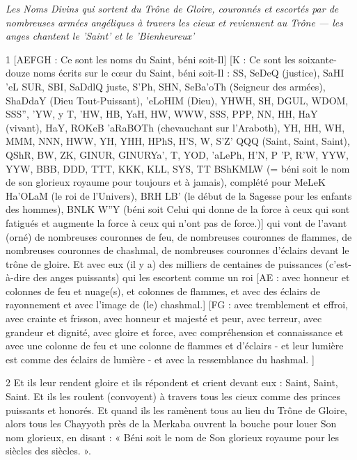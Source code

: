 
\par \textit{Les Noms Divins qui sortent du Trône de Gloire, couronnés et escortés par de nombreuses armées angéliques à travers les cieux et reviennent au Trône — les anges chantent le 'Saint' et le 'Bienheureux'}

\par 1 [AEFGH : Ce sont les noms du Saint, béni soit-Il] [K : Ce sont les soixante-douze noms écrits sur le cœur du Saint, béni soit-Il : SS, SeDeQ (justice), SaHI 'eL SUR, SBI, SaDdlQ {juste}, S'Ph, SHN, SeBa'oTh (Seigneur des armées), ShaDdaY (Dieu Tout-Puissant), 'eLoHIM (Dieu), YHWH, SH, DGUL, WDOM, SSS'', 'YW, y T, 'HW, HB, YaH, HW, WWW, SSS, PPP, NN, HH, HaY (vivant), HaY, ROKeB 'aRaBOTh (chevauchant sur l'Araboth), YH, HH, WH, MMM, NNN, HWW, YH, YHH, HPhS, H'S, W, S'Z' QQQ (Saint, Saint, Saint), QShR, BW, ZK, GINUR, GINURYa', T, YOD, 'aLePh, H'N, P 'P, R'W, YYW, YYW, BBB, DDD, TTT, KKK, KLL, SYS, TT BShKMLW (= béni soit le nom de son glorieux royaume pour toujours et à jamais), complété pour MeLeK Ha'OLaM (le roi de l'Univers), BRH LB' (le début de la Sagesse pour les enfants des hommes), BNLK W''Y (béni soit Celui qui donne de la force à ceux qui sont fatigués et augmente la force à ceux qui n'ont pas de force.)] qui vont de l'avant (orné) de nombreuses couronnes de feu, de nombreuses couronnes de flammes, de nombreuses couronnes de chashmal, de nombreuses couronnes d'éclairs devant le trône de gloire. Et avec eux (il y a) des milliers de centaines de puissances (c'est-à-dire des anges puissants) qui les escortent comme un roi [AE : avec honneur et colonnes de feu et nuage(s), et colonnes de flammes, et avec des éclairs de rayonnement et avec l'image de (le) chashmal.] [FG : avec tremblement et effroi, avec crainte et frisson, avec honneur et majesté et peur, avec terreur, avec grandeur et dignité, avec gloire et force, avec compréhension et connaissance et avec une colonne de feu et une colonne de flammes et d'éclairs - et leur lumière est comme des éclairs de lumière - et avec la ressemblance du hashmal. ]

\par 2 Et ils leur rendent gloire et ils répondent et crient devant eux : Saint, Saint, Saint. Et ils les roulent (convoyent) à travers tous les cieux comme des princes puissants et honorés. Et quand ils les ramènent tous au lieu du Trône de Gloire, alors tous les Chayyoth près de la Merkaba ouvrent la bouche pour louer Son nom glorieux, en disant : « Béni soit le nom de Son glorieux royaume pour les siècles des siècles. ».



